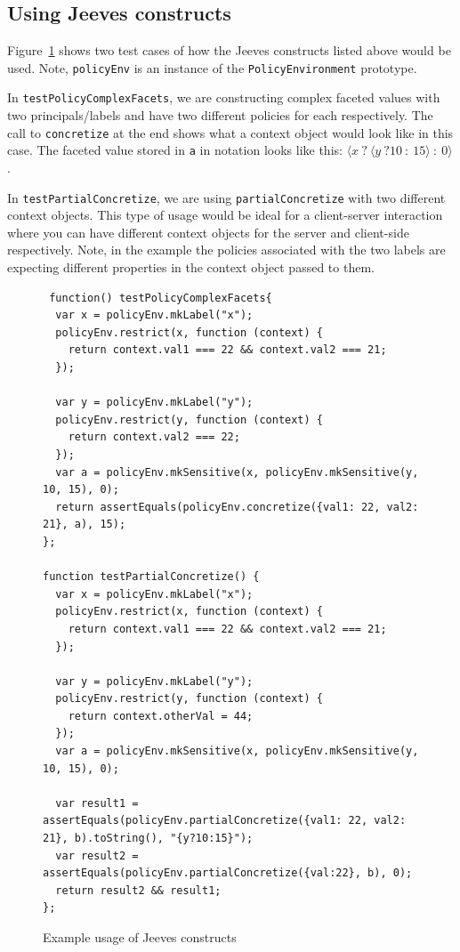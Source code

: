 \subsection{Using Jeeves constructs}
Figure~\ref{fig:JeevesExamples} shows two test cases of how the Jeeves constructs
listed above would be used. Note, \texttt{policyEnv} is an instance of the
\texttt{PolicyEnvironment} prototype.

In \texttt{testPolicyComplexFacets}, we are constructing complex faceted values
with two principals/labels and have two different policies for each respectively.
The call to \texttt{concretize} at the end shows what a context object would look
like in this case. The faceted value stored in \texttt{a} in notation looks like
this: $\langle x~?~\langle y~?10~:~15 \rangle~:~0 \rangle$.

In \texttt{testPartialConcretize}, we are using \texttt{partialConcretize} with
two different context objects. This type of usage would be ideal for a client-server
interaction where you can have different context objects for the server and client-side
respectively. Note, in the example the policies associated with the two labels are
expecting different properties in the context object passed to them.

\begin{figure}
  \begin{lstlisting}
 function() testPolicyComplexFacets{
  var x = policyEnv.mkLabel("x");
  policyEnv.restrict(x, function (context) {
    return context.val1 === 22 && context.val2 === 21;
  });

  var y = policyEnv.mkLabel("y");
  policyEnv.restrict(y, function (context) {
    return context.val2 === 22;
  });
  var a = policyEnv.mkSensitive(x, policyEnv.mkSensitive(y, 10, 15), 0);
  return assertEquals(policyEnv.concretize({val1: 22, val2: 21}, a), 15);
};

function testPartialConcretize() {
  var x = policyEnv.mkLabel("x");
  policyEnv.restrict(x, function (context) {
    return context.val1 === 22 && context.val2 === 21;
  });

  var y = policyEnv.mkLabel("y");
  policyEnv.restrict(y, function (context) {
    return context.otherVal = 44;
  });
  var a = policyEnv.mkSensitive(x, policyEnv.mkSensitive(y, 10, 15), 0);

  var result1 = assertEquals(policyEnv.partialConcretize({val1: 22, val2: 21}, b).toString(), "{y?10:15}");
  var result2 = assertEquals(policyEnv.partialConcretize({val:22}, b), 0);
  return result2 && result1;
};
  \end{lstlisting}
  \caption{Example usage of Jeeves constructs}
  \label{fig:JeevesExamples}
\end{figure}

